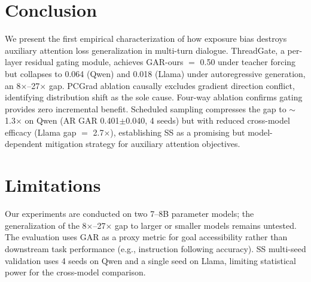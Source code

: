 \documentclass[11pt,a4paper]{article}
\begin{document}
\section{Conclusion}

We present the first empirical characterization of how exposure bias destroys auxiliary attention loss generalization in multi-turn dialogue. ThreadGate, a per-layer residual gating module, achieves GAR-ours $=$ 0.50 under teacher forcing but collapses to 0.064 (Qwen) and 0.018 (Llama) under autoregressive generation, an 8$\times$--27$\times$ gap. PCGrad ablation causally excludes gradient direction conflict, identifying distribution shift as the sole cause. Four-way ablation confirms gating provides zero incremental benefit. Scheduled sampling compresses the gap to $\sim$1.3$\times$ on Qwen (AR GAR 0.401$\pm$0.040, 4 seeds) but with reduced cross-model efficacy (Llama gap $=$ 2.7$\times$), establishing SS as a promising but model-dependent mitigation strategy for auxiliary attention objectives.

\section*{Limitations}

Our experiments are conducted on two 7--8B parameter models; the generalization of the 8$\times$--27$\times$ gap to larger or smaller models remains untested. The evaluation uses GAR as a proxy metric for goal accessibility rather than downstream task performance (e.g., instruction following accuracy). SS multi-seed validation uses 4 seeds on Qwen and a single seed on Llama, limiting statistical power for the cross-model comparison.
\end{document}

